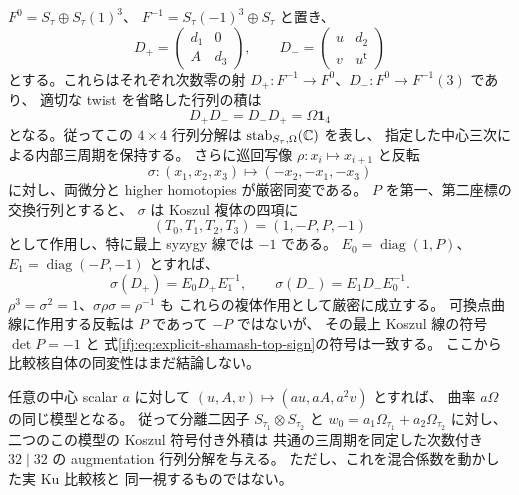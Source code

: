 \begin{proposition}
$F^0=S_\tau\oplus S_\tau(1)^3$、
$F^{-1}=S_\tau(-1)^3\oplus S_\tau$ と置き、
\begin{equation}\label{ifj:eq:explicit-shamash-mf}
 D_+=\begin{pmatrix}d_1&0\\A&d_3\end{pmatrix},
 \qquad
 D_-=\begin{pmatrix}u&d_2\\v&u^{\mathsf t}\end{pmatrix}
\end{equation}
とする。これらはそれぞれ次数零の射
$D_+:F^{-1}\to F^0$、$D_-:F^0\to F^{-1}(3)$ であり、
適切な twist を省略した行列の積は
\[
 D_+D_-=D_-D_+=\Omega\mathbf1_4
\]
となる。従ってこの $4\times4$ 行列分解は
$\operatorname{stab}_{S_\tau,\Omega}(\mathbb C)$ を表し、
指定した中心三次による内部三周期を保持する。
さらに巡回写像 $\rho:x_i\mapsto x_{i+1}$ と反転
\begin{equation}\label{ifj:eq:explicit-shamash-reflection}
 \sigma:(x_1,x_2,x_3)\longmapsto(-x_2,-x_1,-x_3)
\end{equation}
に対し、両微分と higher homotopies が厳密同変である。
$P$ を第一、第二座標の交換行列とすると、
$\sigma$ は Koszul 複体の四項に
\begin{equation}\label{ifj:eq:explicit-shamash-top-sign}
 (T_0,T_1,T_2,T_3)=(1,-P,P,-1)
\end{equation}
として作用し、特に最上 syzygy 線では $-1$ である。
$E_0=\operatorname{diag}(1,P)$、
$E_1=\operatorname{diag}(-P,-1)$ とすれば、
\begin{equation}\label{ifj:eq:explicit-shamash-equivariant-differentials}
 \sigma(D_+)=E_0D_+E_1^{-1},\qquad
 \sigma(D_-)=E_1D_-E_0^{-1}.
\end{equation}
$\rho^3=\sigma^2=1$、$\sigma\rho\sigma=\rho^{-1}$ も
これらの複体作用として厳密に成立する。
可換点曲線に作用する反転は $P$ であって $-P$ ではないが、
その最上 Koszul 線の符号 $\det P=-1$ と
式\eqref{ifj:eq:explicit-shamash-top-sign}の符号は一致する。
ここから比較核自体の同変性はまだ結論しない。

任意の中心 scalar $a$ に対して
$(u,A,v)\mapsto(au,aA,a^2v)$ とすれば、
曲率 $a\Omega$ の同じ模型となる。
従って分離二因子 $S_{\tau_1}\otimes S_{\tau_2}$ と
$w_0=a_1\Omega_{\tau_1}+a_2\Omega_{\tau_2}$ に対し、
二つのこの模型の Koszul 符号付き外積は
共通の三周期を同定した次数付き $32\mid32$ の
augmentation 行列分解を与える。
ただし、これを混合係数を動かした実 Ku 比較核と
同一視するものではない。
\end{proposition}

